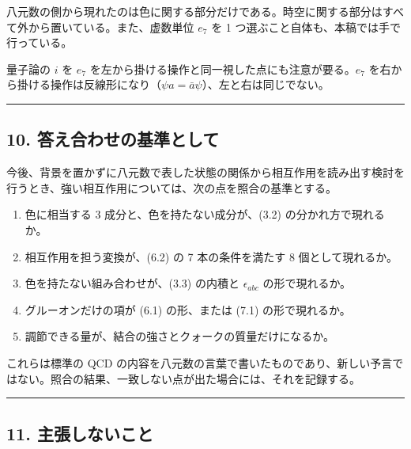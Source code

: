 \documentclass[
  a4paper,
]{ltjsarticle}
\providecommand{\tightlist}{%
  \setlength{\itemsep}{0pt}\setlength{\parskip}{0pt}}
\begin{document}
八元数の側から現れたのは色に関する部分だけである。時空に関する部分はすべて外から置いている。また、虚数単位
\(e_7\) を 1 つ選ぶこと自体も、本稿では手で行っている。

量子論の \(i\) を \(e_7\)
を左から掛ける操作と同一視した点にも注意が要る。\(e_7\)
を右から掛ける操作は反線形になり（\(\psi a = \bar a\psi\)）、左と右は同じでない。

\begin{center}\rule{0.5\linewidth}{0.5pt}\end{center}

\subsection{10.
答え合わせの基準として}\label{ux7b54ux3048ux5408ux308fux305bux306eux57faux6e96ux3068ux3057ux3066}

今後、背景を置かずに八元数で表した状態の関係から相互作用を読み出す検討を行うとき、強い相互作用については、次の点を照合の基準とする。

\begin{enumerate}
\def\labelenumi{\arabic{enumi}.}
\tightlist
\item
  色に相当する 3 成分と、色を持たない成分が、(3.2)
  の分かれ方で現れるか。
\item
  相互作用を担う変換が、(6.2) の 7 本の条件を満たす 8 個として現れるか。
\item
  色を持たない組み合わせが、(3.3) の内積と \(\epsilon_{abc}\)
  の形で現れるか。
\item
  グルーオンだけの項が (6.1) の形、または (7.1) の形で現れるか。
\item
  調節できる量が、結合の強さとクォークの質量だけになるか。
\end{enumerate}

これらは標準の QCD
の内容を八元数の言葉で書いたものであり、新しい予言ではない。照合の結果、一致しない点が出た場合には、それを記録する。

\begin{center}\rule{0.5\linewidth}{0.5pt}\end{center}

\subsection{11.
主張しないこと}\label{ux4e3bux5f35ux3057ux306aux3044ux3053ux3068}
\end{document}
